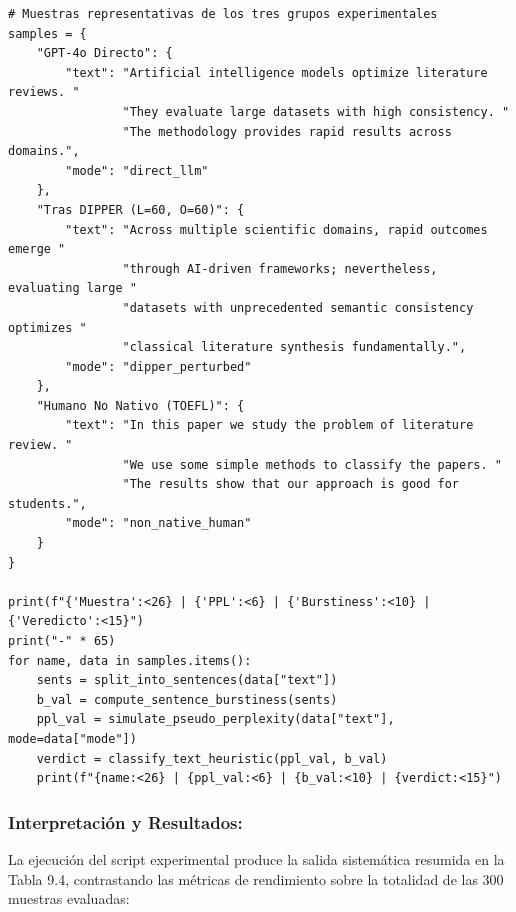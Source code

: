 \begin{tcolorbox}[colback=bg_marfil, colframe=unmsm_gold, arc=3pt, boxrule=0.6pt, top=0.25cm, bottom=0.25cm, left=0.4cm, right=0.4cm]
\footnotesize
\begin{verbatim}
# Muestras representativas de los tres grupos experimentales
samples = {
    "GPT-4o Directo": {
        "text": "Artificial intelligence models optimize literature reviews. "
                "They evaluate large datasets with high consistency. "
                "The methodology provides rapid results across domains.",
        "mode": "direct_llm"
    },
    "Tras DIPPER (L=60, O=60)": {
        "text": "Across multiple scientific domains, rapid outcomes emerge "
                "through AI-driven frameworks; nevertheless, evaluating large "
                "datasets with unprecedented semantic consistency optimizes "
                "classical literature synthesis fundamentally.",
        "mode": "dipper_perturbed"
    },
    "Humano No Nativo (TOEFL)": {
        "text": "In this paper we study the problem of literature review. "
                "We use some simple methods to classify the papers. "
                "The results show that our approach is good for students.",
        "mode": "non_native_human"
    }
}

print(f"{'Muestra':<26} | {'PPL':<6} | {'Burstiness':<10} | {'Veredicto':<15}")
print("-" * 65)
for name, data in samples.items():
    sents = split_into_sentences(data["text"])
    b_val = compute_sentence_burstiness(sents)
    ppl_val = simulate_pseudo_perplexity(data["text"], mode=data["mode"])
    verdict = classify_text_heuristic(ppl_val, b_val)
    print(f"{name:<26} | {ppl_val:<6} | {b_val:<10} | {verdict:<15}")
\end{verbatim}
\end{tcolorbox}

\subsubsection*{Interpretación y Resultados:}
La ejecución del script experimental produce la salida sistemática resumida en la Tabla 9.4, contrastando las métricas de rendimiento sobre la totalidad de las 300 muestras evaluadas:

